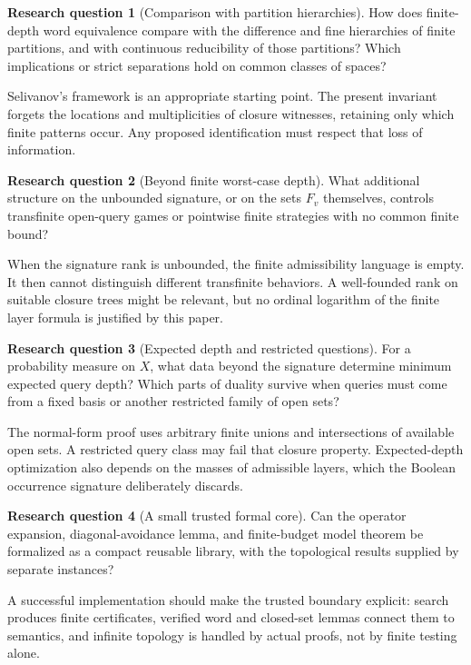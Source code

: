 \documentclass[11pt,letterpaper]{article}
\numberwithin{equation}{section}
\theoremstyle{definition}
\theoremstyle{remark}
\theoremstyle{definition}
\newtheorem{question}{Research question}
\begin{document}
\begin{question}[Comparison with partition hierarchies]\label{cw:q:hierarchies}
How does finite-depth word equivalence compare with the difference and fine
hierarchies of finite partitions, and with continuous reducibility of those
partitions? Which implications or strict separations hold on common classes
of spaces?
\end{question}
Selivanov's framework \cite{Selivanov} is an appropriate starting point.
The present invariant forgets the locations and multiplicities of closure
witnesses, retaining only which finite patterns occur. Any proposed
identification must respect that loss of information.

\begin{question}[Beyond finite worst-case depth]\label{cw:q:transfinite}
What additional structure on the unbounded signature, or on the sets $F_v$
themselves, controls transfinite open-query games or pointwise finite
strategies with no common finite bound?
\end{question}
When the signature rank is unbounded, the finite admissibility language is
empty. It then cannot distinguish different transfinite behaviors. A
well-founded rank on suitable closure trees might be relevant, but no ordinal
logarithm of the finite layer formula is justified by this paper.

\begin{question}[Expected depth and restricted questions]\label{cw:q:expected}
For a probability measure on $X$, what data beyond the signature determine
minimum expected query depth? Which parts of duality survive when queries
must come from a fixed basis or another restricted family of open sets?
\end{question}
The normal-form proof uses arbitrary finite unions and intersections of
available open sets. A restricted query class may fail that closure property.
Expected-depth optimization also depends on the masses of admissible layers,
which the Boolean occurrence signature deliberately discards.

\begin{question}[A small trusted formal core]\label{cw:q:formal}
Can the operator expansion, diagonal-avoidance lemma, and finite-budget model
theorem be formalized as a compact reusable library, with the topological
results supplied by separate instances?
\end{question}
A successful implementation should make the trusted boundary explicit:
search produces finite certificates, verified word and closed-set lemmas
connect them to semantics, and infinite topology is handled by actual proofs,
not by finite testing alone.
\end{document}
